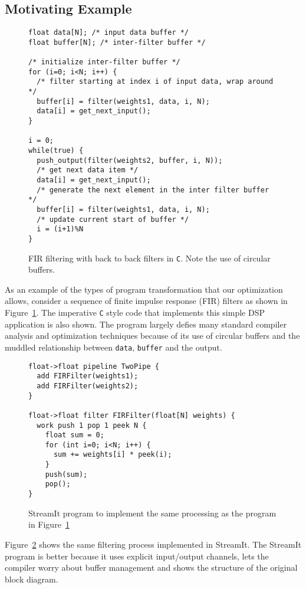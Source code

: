 \subsection{Motivating Example}
\begin{figure}
\epsfxsize=2.0in
\begin{verbatim}
float data[N]; /* input data buffer */
float buffer[N]; /* inter-filter buffer */

/* initialize inter-filter buffer */
for (i=0; i<N; i++) {
  /* filter starting at index i of input data, wrap around */
  buffer[i] = filter(weights1, data, i, N);
  data[i] = get_next_input();
}

i = 0;
while(true) {
  push_output(filter(weights2, buffer, i, N));
  /* get next data item */
  data[i] = get_next_input();
  /* generate the next element in the inter filter buffer */
  buffer[i] = filter(weights1, data, i, N);
  /* update current start of buffer */
  i = (i+1)%N
}
\end{verbatim}
\caption{FIR filtering with back to back filters in {\tt C}. Note the use of circular buffers.}
\label{fig:motivating-example}
\end{figure}

As an example of the types of program transformation that our optimization allows,
consider a sequence of finite impulse response (FIR) filters as shown in 
Figure~\ref{fig:motivating-example}. The imperative {\tt C} style code that implements
this simple DSP application is also shown. The program largely defies many
standard compiler analysis and optimization techniques because of its use of circular
buffers and the muddled relationship between {\tt data}, {\tt buffer} and the output.

\begin{figure}
\begin{verbatim}
float->float pipeline TwoPipe {
  add FIRFilter(weights1);
  add FIRFilter(weights2);
}

float->float filter FIRFilter(float[N] weights) {
  work push 1 pop 1 peek N {
    float sum = 0;
    for (int i=0; i<N; i++) {
      sum += weights[i] * peek(i);
    }
    push(sum);
    pop();
}
\end{verbatim}
\caption{StreamIt program to implement the same processing as the program in Figure~\ref{fig:motivating-example}}
\label{fig:example-streamit}
\end{figure}


Figure~\ref{fig:example-streamit} shows the same filtering process implemented in 
StreamIt. The StreamIt program is better because it uses explicit input/output channels,
lets the compiler worry about buffer management and shows the structure of the original
block diagram. 


